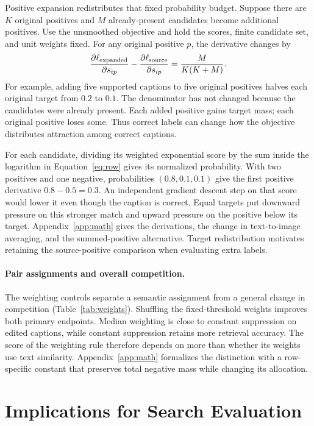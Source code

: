\documentclass[11pt]{article}
\begin{document}
Positive expansion redistributes that fixed probability budget. Suppose there are $K$ original positives and $M$ already-present candidates become additional positives. Use the unsmoothed objective and hold the scores, finite candidate set, and unit weights fixed. For any original positive $p$, the derivative changes by
\begin{equation}
\frac{\partial\ell_{\rm expanded}}{\partial s_{ip}}-\frac{\partial\ell_{\rm source}}{\partial s_{ip}}=\frac{M}{K(K+M)}.
\label{eq:expansion}
\end{equation}
For example, adding five supported captions to five original positives halves each original target from $0.2$ to $0.1$. The denominator has not changed because the candidates were already present. Each added positive gains target mass; each original positive loses some. Thus correct labels can change how the objective distributes attraction among correct captions.

For each candidate, dividing its weighted exponential score by the sum inside the logarithm in Equation~\ref{eq:row} gives its normalized probability. With two positives and one negative, probabilities $(0.8,0.1,0.1)$ give the first positive derivative $0.8-0.5=0.3$. An independent gradient descent step on that score would lower it even though the caption is correct. Equal targets put downward pressure on this stronger match and upward pressure on the positive below its target. Appendix~\ref{app:math} gives the derivations, the change in text-to-image averaging, and the summed-positive alternative. Target redistribution motivates retaining the source-positive comparison when evaluating extra labels.

\paragraph{Pair assignments and overall competition.}

The weighting controls separate a semantic assignment from a general change in competition (Table~\ref{tab:weights}). Shuffling the fixed-threshold weights improves both primary endpoints. Median weighting is close to constant suppression on edited captions, while constant suppression retains more retrieval accuracy. The score of the weighting rule therefore depends on more than whether its weights use text similarity. Appendix~\ref{app:math} formalizes the distinction with a row-specific constant that preserves total negative mass while changing its allocation.

\section{Implications for Search Evaluation}

\end{document}
